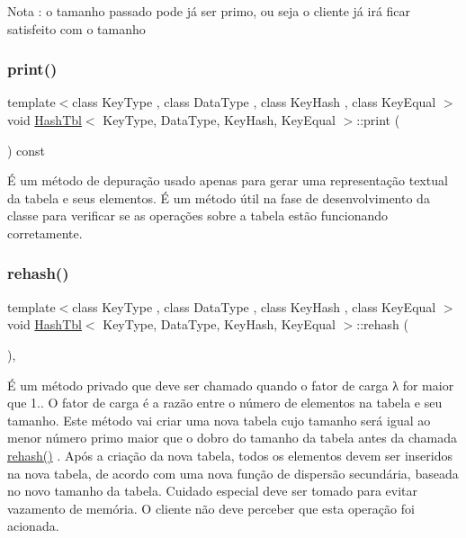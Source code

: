 \begin{DoxyNote}{Nota}
\+: o tamanho passado pode já ser primo, ou seja o cliente já irá ficar satisfeito com o tamanho 
\end{DoxyNote}
\mbox{\label{classHashTbl_a4b78fa6241832fc1d4d8987df0f4fabe}} 
\subsubsection{\texorpdfstring{print()}{print()}}
{\footnotesize\ttfamily template$<$class Key\+Type , class Data\+Type , class Key\+Hash , class Key\+Equal $>$ \\
void \hyperlink{classHashTbl}{Hash\+Tbl}$<$ Key\+Type, Data\+Type, Key\+Hash, Key\+Equal $>$\+::print (\begin{DoxyParamCaption}{ }\end{DoxyParamCaption}) const\hspace{0.3cm}{\ttfamily [inline]}}

É um método de depuração usado apenas para gerar uma representação textual da tabela e seus elementos. É um método útil na fase de desenvolvimento da classe para verificar se as operações sobre a tabela estão funcionando corretamente. \mbox{\label{classHashTbl_a7cebfea55f49e14efd80cbcb2852171e}} 
\subsubsection{\texorpdfstring{rehash()}{rehash()}}
{\footnotesize\ttfamily template$<$class Key\+Type , class Data\+Type , class Key\+Hash , class Key\+Equal $>$ \\
void \hyperlink{classHashTbl}{Hash\+Tbl}$<$ Key\+Type, Data\+Type, Key\+Hash, Key\+Equal $>$\+::rehash (\begin{DoxyParamCaption}{ }\end{DoxyParamCaption})\hspace{0.3cm}{\ttfamily [inline]}, {\ttfamily [private]}}

É um método privado que deve ser chamado quando o fator de carga λ for maior que 1.. O fator de carga é a razão entre o número de elementos na tabela e seu tamanho. Este método vai criar uma nova tabela cujo tamanho será igual ao menor número primo maior que o dobro do tamanho da tabela antes da chamada \hyperlink{classHashTbl_a7cebfea55f49e14efd80cbcb2852171e}{rehash()} . Após a criação da nova tabela, todos os elementos devem ser inseridos na nova tabela, de acordo com uma nova função de dispersão secundária, baseada no novo tamanho da tabela. Cuidado especial deve ser tomado para evitar vazamento de memória. O cliente não deve perceber que esta operação foi acionada. \mbox{\label{classHashTbl_a8ec97ee89ffce2474fb361f974d5f291}} 
